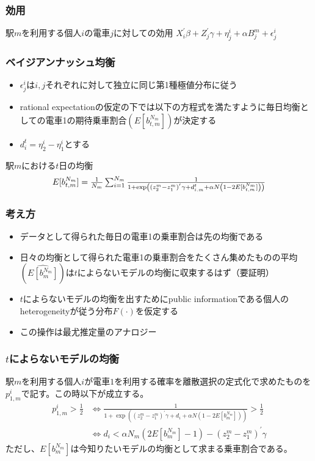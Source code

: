 \documentclass[dvipdfmx, 12pt]{beamer}
\begin{document}
\begin{frame}\frametitle{効用}
	\begin{itembox}[l]{駅$m$を利用する個人$i$の電車$j$に対しての効用}
		$X_i^{'}\beta + Z_j^{'}\gamma + \eta_j^i + \alpha B_j^m + \epsilon_j^i$
	\end{itembox}
\end{frame}

\begin{frame}\frametitle{ベイジアンナッシュ均衡}
	\begin{itemize}
		\item $\epsilon_j^i$は$i, j$それぞれに対して独立に同じ第1種極値分布に従う
		\item rational expectationの仮定の下では以下の方程式を満たすように毎日均衡としての電車1の期待乗車割合$(E[b_{t,m}^{N_m}])$が決定する
		\item $d_i^t = \eta_2^i - \eta_1^i$とする
	\end{itemize}
	\begin{itembox}[l]{駅$m$における$t$日の均衡}
		\begin{align*}
		\scalebox{1}{$
                	E[b_{t,m}^{N_m}] = \frac{1}{N_m} \sum_{i = 1}^{N_m} \frac{1}{1 + \exp\left( (z_2^m - z_1^m)^{'}\gamma + d_{i.m}^t + \alpha N \left(1 - 2E[b_{t,m}^{N_m}]\right) \right)} $}
                \end{align*}
	\end{itembox}
\end{frame}

\begin{frame}\frametitle{考え方}
	\begin{itemize}
		\item データとして得られた毎日の電車1の乗車割合は先の均衡である
		\item 日々の均衡として得られた電車1の乗車割合をたくさん集めたものの平均$(\widehat{E[b_m^{N_m}]})$は$t$によらないモデルの均衡に収束するはず（要証明）
		\item $t$によらないモデルの均衡を出すためにpublic informationである個人のheterogeneityが従う分布$F(\cdot)$を仮定する
		\item この操作は最尤推定量のアナロジー
	\end{itemize}
\end{frame}

\begin{frame}\frametitle{$t$によらないモデルの均衡}
	駅$m$を利用する個人$i$が電車$1$を利用する確率を離散選択の定式化で求めたものを$p_{1,m}^i$で記す。この時以下が成立する。
        \begin{align*}
        	p_{1,m}^i > \frac{1}{2} &\Leftrightarrow \frac{1}{1 + \exp\left( (z_2^m - z_1^m)^{'}\gamma + d_i + \alpha N \left(1 - 2E[b_m^{N_m}]\right) \right)} > \frac{1}{2}\\[8pt]
        	&\Leftrightarrow d_i < \alpha N_m \left(2E[b_m^{N_m}] - 1\right) - (z_2^m - z_1^m)^{'}\gamma
        \end{align*}
ただし、$E[b_m^{N_m}]$は今知りたいモデルの均衡として求まる乗車割合である。
\end{frame}
\end{document}
